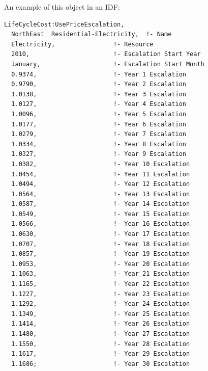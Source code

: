 An example of this object in an IDF:

\begin{lstlisting}
LifeCycleCost:UsePriceEscalation,
  NorthEast  Residential-Electricity,  !- Name
  Electricity,                !- Resource
  2010,                       !- Escalation Start Year
  January,                    !- Escalation Start Month
  0.9374,                     !- Year 1 Escalation
  0.9790,                     !- Year 2 Escalation
  1.0138,                     !- Year 3 Escalation
  1.0127,                     !- Year 4 Escalation
  1.0096,                     !- Year 5 Escalation
  1.0177,                     !- Year 6 Escalation
  1.0279,                     !- Year 7 Escalation
  1.0334,                     !- Year 8 Escalation
  1.0327,                     !- Year 9 Escalation
  1.0382,                     !- Year 10 Escalation
  1.0454,                     !- Year 11 Escalation
  1.0494,                     !- Year 12 Escalation
  1.0564,                     !- Year 13 Escalation
  1.0587,                     !- Year 14 Escalation
  1.0549,                     !- Year 15 Escalation
  1.0566,                     !- Year 16 Escalation
  1.0630,                     !- Year 17 Escalation
  1.0707,                     !- Year 18 Escalation
  1.0857,                     !- Year 19 Escalation
  1.0953,                     !- Year 20 Escalation
  1.1063,                     !- Year 21 Escalation
  1.1165,                     !- Year 22 Escalation
  1.1227,                     !- Year 23 Escalation
  1.1292,                     !- Year 24 Escalation
  1.1349,                     !- Year 25 Escalation
  1.1414,                     !- Year 26 Escalation
  1.1480,                     !- Year 27 Escalation
  1.1550,                     !- Year 28 Escalation
  1.1617,                     !- Year 29 Escalation
  1.1686;                     !- Year 30 Escalation
\end{lstlisting}